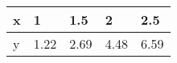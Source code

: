 \documentclass{article}
\begin{document}
\begin{table}[h!]
\begin{tabular}{l|l|l|l|l}

\multicolumn{1}{p{30.865313pt}}{\raggedright x} & \multicolumn{1}{|p{30.865313pt}}{\raggedright 1} & \multicolumn{1}{|p{32.370937pt}}{\raggedright 1.5} & \multicolumn{1}{|p{30.1125pt}}{\raggedright 2} & \multicolumn{1}{|p{30.1125pt}}{\raggedright 2.5}\\ 
\hline 
\multicolumn{1}{p{30.865313pt}}{\raggedright y} & \multicolumn{1}{|p{30.865313pt}}{\raggedright 1.22} & \multicolumn{1}{|p{32.370937pt}}{\raggedright 2.69} & \multicolumn{1}{|p{30.1125pt}}{\raggedright 4.48} & \multicolumn{1}{|p{30.1125pt}}{\raggedright 6.59}\\ 


\end{tabular}
\end{table}
\end{document}
